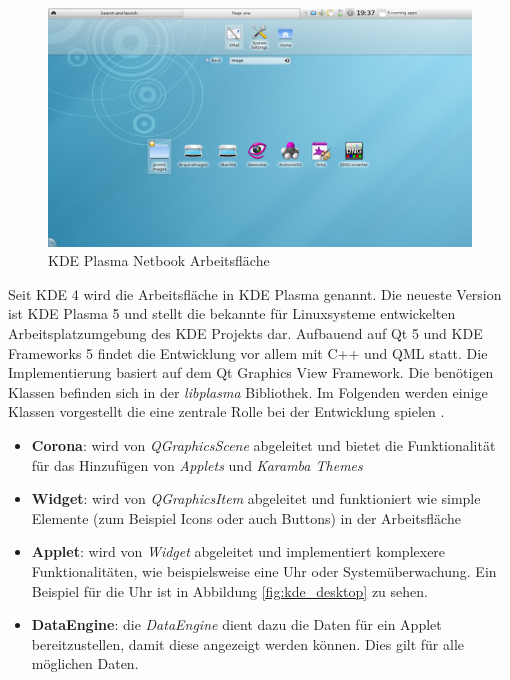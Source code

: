 \begin{figure}[h]
	\centering
	\includegraphics[width=0.9\columnwidth]{images/netbook.png}
	\caption{KDE Plasma Netbook Arbeitsfläche \cite{KDEWorkspaces}}
	\label{fig:kde_netbook}
\end{figure}


Seit KDE 4 wird die Arbeitsfläche in KDE Plasma genannt. Die neueste Version ist KDE Plasma 5 und stellt die bekannte für Linuxsysteme entwickelten Arbeitsplatzumgebung des KDE Projekts dar. Aufbauend auf Qt 5 und KDE Frameworks 5 findet die Entwicklung vor allem mit C++ und QML statt. Die Implementierung basiert auf dem Qt Graphics View Framework. Die benötigen Klassen befinden sich in der \textit{libplasma} Bibliothek. Im Folgenden werden einige Klassen vorgestellt die eine zentrale Rolle bei der Entwicklung spielen \cite{KDEPlasma}.

\begin{itemize}
	\item \textbf{Corona}: wird von \textit{QGraphicsScene} abgeleitet und bietet die Funktionalität für das Hinzufügen von \textit{Applets} und \textit{Karamba Themes}
	\item \textbf{Widget}: wird von \textit{QGraphicsItem} abgeleitet und funktioniert wie simple Elemente (zum Beispiel Icons oder auch Buttons) in der Arbeitsfläche
	\item \textbf{Applet}: wird von \textit{Widget} abgeleitet und implementiert komplexere Funktionalitäten, wie beispielsweise eine Uhr oder Systemüberwachung. Ein Beispiel für die Uhr ist in Abbildung \ref{fig:kde_desktop} zu sehen.
	\item \textbf{DataEngine}: die \textit{DataEngine} dient dazu die Daten für ein Applet bereitzustellen, damit diese angezeigt werden können. Dies gilt für alle möglichen Daten.
\end{itemize}

